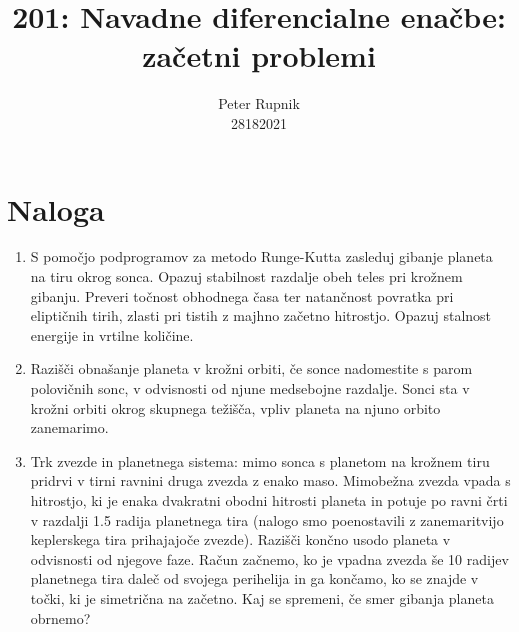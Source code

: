 \documentclass[a4paper,oneside,12pt]{article}
\title{201: Navadne diferencialne enačbe: začetni problemi}
\author{Peter Rupnik\\28182021}
\begin{document}
\maketitle
\section{Naloga}
\begin{enumerate}

  \item S pomočjo podprogramov za metodo Runge-Kutta zasleduj gibanje
        planeta na tiru okrog sonca. Opazuj stabilnost razdalje obeh teles
        pri krožnem gibanju. Preveri točnost obhodnega časa ter
        natančnost povratka pri eliptičnih tirih, zlasti pri tistih z majhno
        začetno hitrostjo. Opazuj stalnost energije in vrtilne količine.

  \item Razišči obnašanje planeta v krožni orbiti,
        če sonce nadomestite s parom polovičnih sonc,
        v odvisnosti od njune medsebojne razdalje.
        Sonci sta v krožni orbiti okrog skupnega težišča, vpliv planeta na njuno
        orbito zanemarimo.

  \item Trk zvezde in planetnega sistema: mimo sonca s planetom na
        krožnem tiru pridrvi v tirni ravnini druga zvezda z enako
        maso. Mimobežna zvezda vpada s hitrostjo, ki je enaka dvakratni
        obodni hitrosti planeta in potuje po ravni črti v razdalji 1.5
        radija planetnega tira (nalogo smo poenostavili z zanemaritvijo
        keplerskega tira prihajajoče zvezde).  Razišči končno usodo planeta
        v odvisnosti od njegove faze. Račun začnemo, ko je vpadna zvezda še
        10 radijev planetnega tira daleč od svojega perihelija in ga
        končamo, ko se znajde v točki, ki je simetrična na začetno. Kaj se
        spremeni, če smer gibanja planeta obrnemo?


\end{enumerate}


\end{document}
